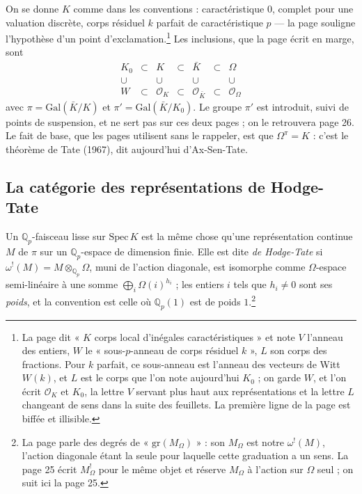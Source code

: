 \documentclass[11pt,a4paper]{article}
\begin{document}
On se donne $K$ comme dans les conventions : caractéristique $0$, complet
pour une valuation discrète, corps résiduel $k$ parfait de caractéristique
$p$ --- la page souligne l'hypothèse d'un point d'exclamation.\footnote{La
page dit « $K$ corps local d'inégales caractéristiques » et note $V$ l'anneau
des entiers, $W$ le « sous-$p$-anneau de corps résiduel $k$ », $L$ son corps
des fractions. Pour $k$ parfait, ce sous-anneau est l'anneau des vecteurs de
Witt $W(k)$, et $L$ est le corps que l'on note aujourd'hui $K_0$ ; on garde
$W$, et l'on écrit $\mathcal{O}_K$ et $K_0$, la lettre $V$ servant plus haut
aux représentations et la lettre $L$ changeant de sens dans la suite des
feuillets. La première ligne de la page est biffée et illisible.} Les
inclusions, que la page écrit en marge, sont
\[
\begin{array}{ccccccc}
K_0 & \subset & K & \subset & \bar{K} & \subset & \Omega \\
\cup & & \cup & & \cup & & \cup \\
W & \subset & \mathcal{O}_K & \subset & \mathcal{O}_{\bar{K}} & \subset & \mathcal{O}_{\Omega}
\end{array}
\]
avec $\pi = \mathrm{Gal}(\bar{K}/K)$ et $\pi' = \mathrm{Gal}(\bar{K}/K_0)$. Le
groupe $\pi'$ est introduit, suivi de points de suspension, et ne sert pas
sur ces deux pages ; on le retrouvera page 26. Le fait de base, que les pages
utilisent sans le rappeler, est que $\Omega^{\pi} = K$ : c'est le théorème de
Tate (1967), dit aujourd'hui d'Ax-Sen-Tate.

\subsection*{La catégorie des représentations de Hodge-Tate}

Un $\mathbb{Q}_p$-faisceau lisse sur $\mathrm{Spec}\, K$ est la même chose
qu'une représentation continue $M$ de $\pi$ sur un $\mathbb{Q}_p$-espace de
dimension finie. Elle est dite \emph{de Hodge-Tate} si $\omega^{!}(M) = M
\otimes_{\mathbb{Q}_p} \Omega$, muni de l'action diagonale, est isomorphe
comme $\Omega$-espace semi-linéaire à une somme $\bigoplus_i
\Omega(i)^{h_i}$ ; les entiers $i$ tels que $h_i \neq 0$ sont ses
\emph{poids}, et la convention est celle où $\mathbb{Q}_p(1)$ est de poids
$1$.\footnote{La page parle des degrés de « $\mathrm{gr}(M_{\Omega})$ » : son
$M_{\Omega}$ est notre $\omega^{!}(M)$, l'action diagonale étant la seule pour
laquelle cette graduation a un sens. La page 25 écrit $M^{!}_{\Omega}$ pour
le même objet et réserve $M_{\Omega}$ à l'action sur $\Omega$ seul ; on suit
ici la page 25.}
\end{document}
